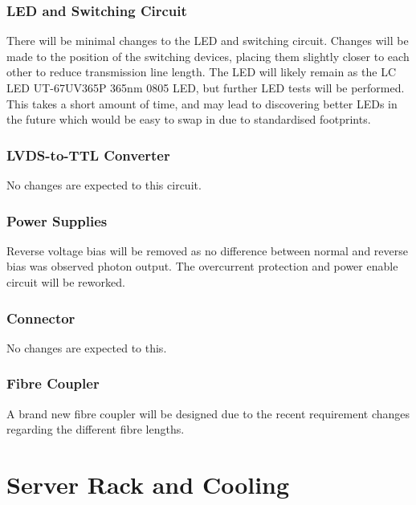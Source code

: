 \documentclass[a4paper,11pt]{article}
\begin{document}
\subsubsection{LED and Switching Circuit}

There will be minimal changes to the LED and switching circuit. Changes will be made to the position of the switching devices, placing them slightly closer to each other to reduce transmission line length. The LED will likely remain as the LC LED UT-67UV365P 365nm 0805 LED, but further LED tests will be performed. This takes a short amount of time, and may lead to discovering better LEDs in the future which would be easy to swap in due to standardised footprints.

\subsubsection{LVDS-to-TTL Converter}

No changes are expected to this circuit.

\subsubsection{Power Supplies}

Reverse voltage bias will be removed as no difference between normal and reverse bias was observed photon output. The overcurrent protection and power enable circuit will be reworked.

\subsubsection{Connector}

No changes are expected to this.

\subsubsection{Fibre Coupler}

A brand new fibre coupler will be designed due to the recent requirement changes regarding the different fibre lengths.


\section{Server Rack and Cooling}
\end{document}
